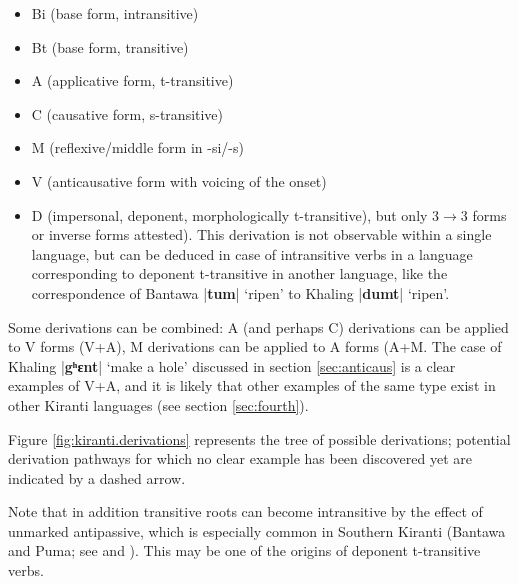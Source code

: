 \documentclass[oneside,a4paper,11pt]{article}
\newcommand{\ipa}[1]{\textbf{{\phon\mbox{#1}}}} %
\newcommand{\dhatu}[2]{|\ipa{#1}| `#2'}
\begin{document}
\begin{itemize}
\item  Bi (base form, intransitive)
\item  Bt (base form, transitive)
\item  A (applicative form, t-transitive)
\item  C (causative form, s-transitive)
\item M (reflexive/middle form in -si/-s)
\item V (anticausative form with voicing of the onset)
\item D (impersonal, deponent, morphologically t-transitive), but only 3$\rightarrow$3 forms or inverse forms attested). This derivation is not observable within a single language, but can be deduced in case of intransitive verbs in a language corresponding to deponent t-transitive in another language, like  the correspondence of Bantawa \dhatu{tum}{ripen} to Khaling \dhatu{dumt}{ripen}.
\end{itemize}

Some derivations can be combined: A (and perhaps C) derivations can be applied to V forms (V+A), M derivations can be applied to A forms (A+M. The case of Khaling \dhatu{gʰɛnt}{make a hole} discussed in section \ref{sec:anticaus} is a clear examples of V+A, and it is likely that other examples of the same type exist in other Kiranti languages (see section \ref{sec:fourth}). 

Figure \ref{fig:kiranti.derivations} represents the tree of possible derivations; potential derivation pathways for which no clear example has been discovered yet are indicated by a dashed arrow. 

Note that in addition transitive roots can become intransitive by the effect of unmarked antipassive, which is especially common in Southern Kiranti (Bantawa and Puma; see \citealt{bickel07puma} and \citealt{bickel15antipassive}). This may be one of the origins of deponent t-transitive verbs.
\end{document}
